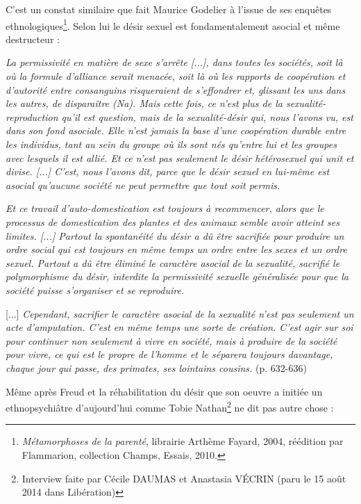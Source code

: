  C'est un constat similaire que fait Maurice Godelier à l'issue de ses enquêtes ethnologiques\footnote{\emph{Métamorphoses de la parenté}, librairie Arthème Fayard, 2004, réédition par Flammarion, collection Champs, Essais, 2010.}.  Selon lui le désir sexuel est fondamentalement asocial et même destructeur :
 \begin{displayquote}{\emph{La permissivité en matière de sexe s'arrête \emph{[...]}, dans toutes les sociétés, soit là où la formule d'alliance serait menacée, soit là où les rapports de coopération et d'autorité entre consanguins risqueraient de s'effondrer et, glissant les uns dans les autres, de disparaître (Na). Mais cette fois, ce n'est plus de la sexualité-reproduction qu'il est question, mais de la sexualité-désir qui, nous l'avons vu, est dans son fond asociale. Elle n'est jamais la base d'une coopération durable entre les individus, tant au sein du groupe où ils sont nés qu'entre lui et les groupes avec lesquels il est allié. Et ce n'est pas seulement le désir hétérosexuel qui unit et divise. \emph{[...]} C'est, nous l'avons dit, parce que le désir sexuel en lui-même est asocial qu'aucune société ne peut permettre que tout soit permis.}
 
 \emph{Et ce travail d'auto-domestication est toujours à recommencer, alors que le processus de domestication des plantes et des animaux semble avoir atteint ses limites. \emph{[...]} Partout la spontanéité du désir a dû être sacrifiée pour produire un ordre social qui est toujours en même temps un ordre entre les sexes et un ordre sexuel. Partout a dû être éliminé le caractère asocial de la sexualité, sacrifié le polymorphisme du désir, interdite la permissivité sexuelle généralisée pour que la société puisse s'organiser et se reproduire.}
 
[...] \emph{Cependant, sacrifier le caractère asocial de la sexualité n'est pas seulement un acte d'amputation.  C'est en même temps une sorte de création. C'est agir sur soi pour continuer non seulement à vivre en société, mais à produire de la société pour vivre, ce qui est le propre de l'homme et le séparera toujours davantage, chaque jour qui passe, des primates, ses lointains cousins.} (p. 632-636)}
\end{displayquote}

Même après Freud et la réhabilitation du désir que son oeuvre a initiée un ethnopsychiâtre d'aujourd'hui  comme Tobie Nathan\footnote{Interview faite par Cécile DAUMAS et Anastasia VÉCRIN (paru le 15 août 2014 dans Libération)} ne dit pas autre chose :

